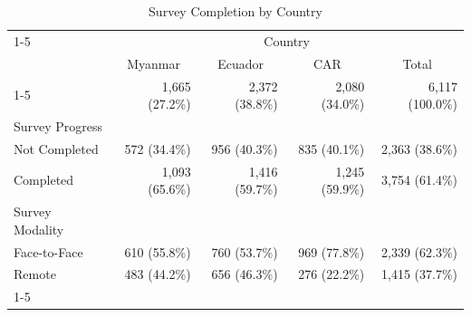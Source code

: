 \begin{table}[!h]
\caption{Survey Completion by Country}
\centering
\begin{tabular}{lllll}
\cline{1-5}
\multicolumn{1}{r}{} &
  \multicolumn{4}{c}{Country} \\
\multicolumn{1}{r}{} &
  \multicolumn{1}{c}{Myanmar} &
  \multicolumn{1}{c}{Ecuador} &
  \multicolumn{1}{c}{CAR} &
  \multicolumn{1}{c}{Total} \\
\cline{1-5}
\multicolumn{1}{l}{N} &
  \multicolumn{1}{r}{1,665 (27.2\%)} &
  \multicolumn{1}{r}{2,372 (38.8\%)} &
  \multicolumn{1}{r}{2,080 (34.0\%)} &
  \multicolumn{1}{r}{6,117 (100.0\%)} \\
\multicolumn{1}{l}{Survey Progress} &
  \multicolumn{1}{r}{} &
  \multicolumn{1}{r}{} &
  \multicolumn{1}{r}{} &
  \multicolumn{1}{r}{} \\
\multicolumn{1}{l}{\hspace{1em}Not Completed} &
  \multicolumn{1}{r}{572 (34.4\%)} &
  \multicolumn{1}{r}{956 (40.3\%)} &
  \multicolumn{1}{r}{835 (40.1\%)} &
  \multicolumn{1}{r}{2,363 (38.6\%)} \\
\multicolumn{1}{l}{\hspace{1em}Completed} &
  \multicolumn{1}{r}{1,093 (65.6\%)} &
  \multicolumn{1}{r}{1,416 (59.7\%)} &
  \multicolumn{1}{r}{1,245 (59.9\%)} &
  \multicolumn{1}{r}{3,754 (61.4\%)} \\
\multicolumn{1}{l}{Survey Modality} &
  \multicolumn{1}{r}{} &
  \multicolumn{1}{r}{} &
  \multicolumn{1}{r}{} &
  \multicolumn{1}{r}{} \\
\multicolumn{1}{l}{\hspace{1em}Face-to-Face} &
  \multicolumn{1}{r}{610 (55.8\%)} &
  \multicolumn{1}{r}{760 (53.7\%)} &
  \multicolumn{1}{r}{969 (77.8\%)} &
  \multicolumn{1}{r}{2,339 (62.3\%)} \\
\multicolumn{1}{l}{\hspace{1em}Remote} &
  \multicolumn{1}{r}{483 (44.2\%)} &
  \multicolumn{1}{r}{656 (46.3\%)} &
  \multicolumn{1}{r}{276 (22.2\%)} &
  \multicolumn{1}{r}{1,415 (37.7\%)} \\
\cline{1-5}
\end{tabular}
\end{table}
